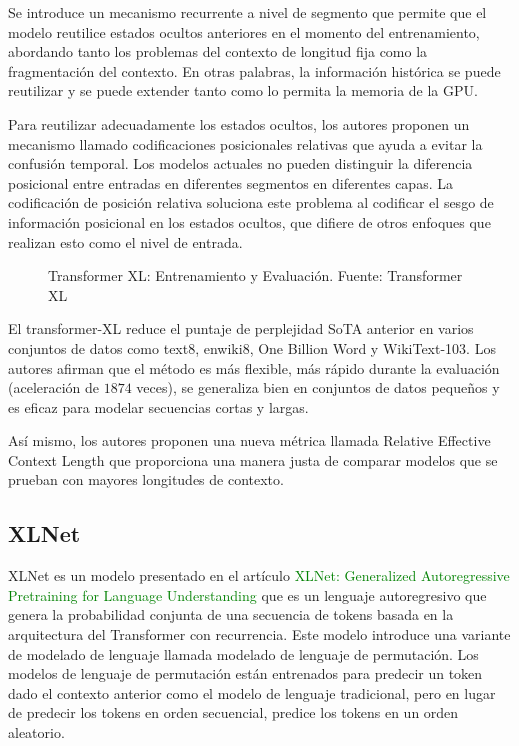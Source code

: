 \documentclass[conference]{IEEEtran}
\begin{document}
\vspace{0.2cm}

Se introduce un mecanismo recurrente a nivel de segmento que permite que el modelo reutilice estados ocultos anteriores en el momento del entrenamiento, abordando tanto los problemas del contexto de longitud fija como la fragmentaci\'on del contexto. En otras palabras, la informaci\'on hist\'orica se puede reutilizar y se puede extender tanto como lo permita la memoria de la GPU.
	
\vspace{0.2cm}

Para reutilizar adecuadamente los estados ocultos, los autores proponen un mecanismo llamado codificaciones posicionales relativas  que ayuda a evitar la confusi\'on temporal. Los modelos actuales no pueden distinguir la diferencia posicional entre entradas en diferentes segmentos en diferentes capas. La codificaci\'on de posici\'on relativa soluciona este problema al codificar el sesgo de informaci\'on posicional en los estados ocultos, que difiere de otros enfoques que realizan esto como el nivel de entrada.

\begin{figure}[h]
\caption{Transformer XL: Entrenamiento y Evaluación. Fuente: Transformer XL \cite{b7}}
\end{figure}


\vspace{0.2cm}


El transformer-XL reduce el puntaje de perplejidad SoTA anterior en varios conjuntos de datos como text8, enwiki8, One Billion Word y WikiText-103. Los autores afirman que el m\'etodo es m\'as flexible, m\'as r\'apido durante la evaluaci\'on (aceleraci\'on de $1874$ veces), se generaliza bien en conjuntos de datos peque\~nos y es eficaz para modelar secuencias cortas y largas.

\vspace{0.2cm}

As\'i mismo, los autores proponen una nueva m\'etrica llamada Relative Effective Context Length que proporciona una manera justa de comparar modelos que se prueban con mayores longitudes de contexto.

\subsection{XLNet}

XLNet es un modelo presentado en el art\'iculo \textcolor{green}{XLNet: Generalized Autoregressive Pretraining for Language Understanding} \cite{b8} que es un lenguaje autoregresivo que genera la probabilidad conjunta de una secuencia de tokens basada en la arquitectura del Transformer con recurrencia. Este modelo introduce una variante de modelado de lenguaje llamada modelado de lenguaje de permutaci\'on. Los modelos de lenguaje de permutaci\'on est\'an entrenados para predecir un token dado el contexto anterior como el modelo de lenguaje tradicional, pero en lugar de predecir los tokens en orden secuencial, predice los tokens en un orden aleatorio.
\end{document}
